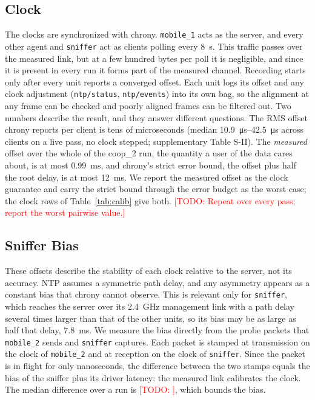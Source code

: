 \documentclass[journal]{IEEEtran}
\newcommand{\todo}[1]{\textcolor{red}{[TODO: #1]}}
\begin{document}
\subsection{Clock}
\label{sec:clock}
The clocks are synchronized with chrony. \texttt{mobile\_1} acts as
the server, and every other agent and \texttt{sniffer} act as clients
polling every \SI{8}{\second}. This traffic passes over the measured
link, but at a few hundred bytes per poll it is negligible, and since
it is present in every run it forms part of the measured channel.
Recording starts only after every unit reports a converged offset.
Each unit logs its offset and any clock adjustment
(\texttt{ntp/status}, \texttt{ntp/events}) into its own bag, so the
alignment at any frame can be checked and poorly aligned frames can
be filtered out. Two numbers describe the result, and they answer
different questions. The RMS offset chrony reports per client is tens
of microseconds (median \SIrange{10.9}{42.5}{\micro\second} across
clients on a live pass, no clock stepped; supplementary Table S-II).
The \emph{measured} offset over the whole of the coop\_2 run, the
quantity a user of the data cares about, is at most
\SI{0.99}{\milli\second}, and chrony's strict error bound, the
offset plus half the root delay, is at most \SI{12}{\milli\second}.
We report the measured offset as the clock guarantee and carry the
strict bound through the error budget as the worst case; the clock
rows of Table~\ref{tab:calib} give both. \todo{Repeat over every
pass; report the worst pairwise value.}

\subsection{Sniffer Bias}
\label{sec:sniffer}
These offsets describe the stability of each clock relative to the
server, not its accuracy. NTP assumes a symmetric path delay, and any
asymmetry appears as a constant bias that chrony cannot observe. This
is relevant only for \texttt{sniffer}, which reaches the server over
its \SI{2.4}{\giga\hertz} management link with a path delay several
times larger than that of the other units, so its bias may be as large
as half that delay, \SI{7.8}{\milli\second}. We measure the bias
directly from the probe packets that \texttt{mobile\_2} sends and
\texttt{sniffer} captures. Each packet is stamped at transmission on
the clock of \texttt{mobile\_2} and at reception on the clock of
\texttt{sniffer}. Since the packet is in flight for only nanoseconds,
the difference between the two stamps equals the bias of the sniffer
plus its driver latency: the measured link calibrates the clock. The
median difference over a run is \todo{}, which bounds the bias.
\end{document}
